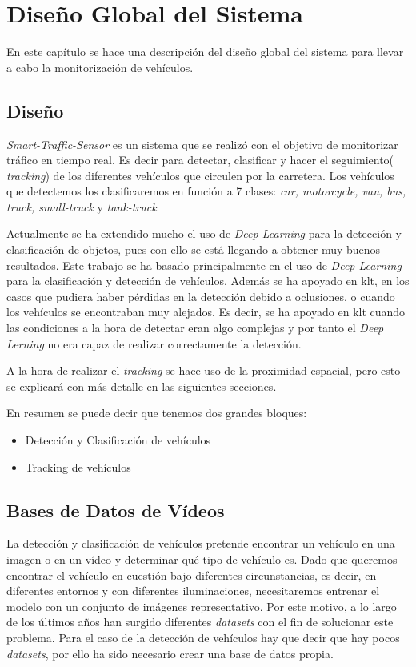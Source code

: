 \chapter{Diseño Global del Sistema}\label{cap.diseno}

En este capítulo se hace una descripción del diseño global del sistema para llevar a cabo la monitorización de vehículos.

\section{Diseño}

\textit{Smart-Traffic-Sensor} es un sistema que se realizó con el objetivo de monitorizar tráfico en tiempo real. Es decir para detectar, clasificar y hacer el seguimiento( \textit{tracking}) de los diferentes vehículos que circulen por la carretera. Los vehículos que detectemos los clasificaremos en función a 7 clases:  \textit{car, motorcycle, van, bus, truck, small-truck} y \textit{tank-truck}. 

Actualmente se ha extendido mucho el uso de \textit{Deep Learning} para la detección y clasificación de objetos, pues con ello se está llegando a obtener muy buenos resultados. Este trabajo se ha basado principalmente en el uso de \textit{Deep Learning} para la clasificación y detección de vehículos. Además se ha apoyado en \acrfull{klt}, en los casos que pudiera haber pérdidas en la detección debido a oclusiones, o cuando los vehículos se encontraban muy alejados. Es decir, se ha apoyado en \acrshort{klt} cuando las condiciones a la hora de detectar eran algo complejas y por tanto el \textit{Deep Lerning} no era capaz de realizar correctamente la detección.

A la hora de realizar el \textit{tracking} se hace uso de la proximidad espacial, pero esto se explicará con más detalle en las siguientes secciones.

En resumen se puede decir que tenemos dos grandes bloques:
\begin{itemize}
    \item Detección y Clasificación de vehículos
    \item Tracking de vehículos
\end{itemize}


\section{Bases de Datos de Vídeos}

La detección y clasificación de vehículos pretende encontrar un vehículo en una imagen o en un vídeo y determinar qué tipo de
vehículo es. Dado que queremos encontrar el vehículo en cuestión bajo diferentes circunstancias, es decir, en diferentes entornos y con diferentes iluminaciones, necesitaremos entrenar el modelo con un conjunto de imágenes representativo. Por este motivo, a lo largo de los últimos años han surgido diferentes \textit{datasets} con el fin de solucionar este problema. Para el caso de la detección de vehículos hay que decir que hay pocos \textit{datasets}, por ello ha sido necesario crear una base de datos propia.

